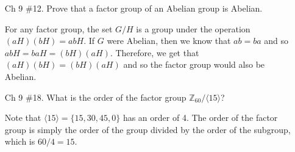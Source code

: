 \documentclass{article}
\newcommand{\Z}{\mathbb Z}
\begin{document}
\begin{enumerate}
    \item[Ch 9 \#12.]Prove that a factor group of an Abelian group is Abelian.
    
    \begin{flushleft}
    For any factor group, the set $G/H$ is a group under the operation $(aH)(bH) = abH$. If $G$ were Abelian, then we know that $ab = ba$ and so $abH = baH = (bH)(aH)$. Therefore, we get that $(aH)(bH) = (bH)(aH)$ and so the factor group would also be Abelian.
    \end{flushleft}

    \item[Ch 9 \#18.]What is the order of the factor group $\Z_{60}/\langle15\rangle$?
    
    \begin{flushleft}
    Note that $\langle15\rangle = \{15, 30, 45, 0\}$ has an order of 4. The order of the factor group is simply the order of the group divided by the order of the subgroup, which is $60/4 = 15$.
    \end{flushleft}

\end{enumerate}
\end{document}
